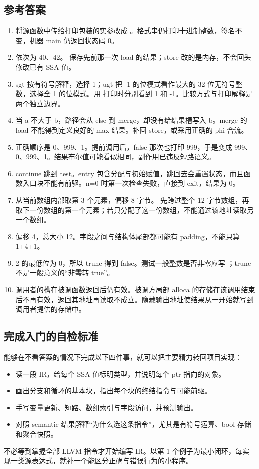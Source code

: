 \subsection{参考答案}
\begin{enumerate}[label=\textbf{\arabic*.}]
 \item 将源函数中传给打印包装的实参改成 。格式串仍打印十进制整数，签名不变，机器 main 仍返回状态码 0。
 \item 依次为 40、42。 保存先前那一次 load 的结果；store 改的是内存，不会回头修改已有 SSA 值。
 \item sgt 按有符号解释，选择 1；ugt 把 -1 的位模式看作最大的 32 位无符号整数，选择全 1 的位模式。用  打印时分别看到 1 和 -1。比较方式与打印解释是两个独立边界。
 \item 当 a 不大于 b，路径会从 else 到 merge，却没有给结果槽写入 b。merge 的 load 不能得到定义良好的 max 结果。补回 store，或采用正确的 phi 合流。
 \item 正确顺序是 0、999、1。提前调用后，false 那次也打印 999，于是变成 999、0、999、1。结果布尔值可能看似相同，副作用已违反短路语义。
 \item continue 跳到 test。entry 包含分配与初始赋值，跳回去会重置状态，而且函数入口块不能有前驱。n=0 时第一次检查失败，直接到 exit，结果为 0。
 \item {} 从当前数组内部取第 3 个元素，偏移 8 字节。 先跨过整个 12 字节数组，再取下一份数组的第一个元素；若只分配了这一份数组，不能通过该地址读取另一个数组。
 \item 偏移 4，总大小 12。字段之间与结构体尾部都可能有 padding，不能只算 1+4+1。
 \item 2 的最低位为 0，所以 trunc 得到 false。测试一般整数是否非零应写 ；trunc 不是一般意义的“非零转 true”。
 \item 调用者的槽在被调函数返回后仍有效。被调方局部 alloca 的存储在该调用结束后不再有效，返回其地址再读取不成立。隐藏输出地址使结果从一开始就写到调用者提供的存储中。
\end{enumerate}

\subsection{完成入门的自检标准}
能够在不看答案的情况下完成以下四件事，就可以把主要精力转回项目实现：
\begin{itemize}
 \item 读一段 IR，给每个 SSA 值标明类型，并说明每个 ptr 指向的对象。
 \item 画出分支和循环的基本块，指出每个块的终结指令与可能前驱。
 \item 手写变量更新、短路、数组索引与字段访问，并预测输出。
 \item 对照 semantic 结果解释“为什么选这条指令”，尤其是有符号运算、bool 存储和聚合快照。
\end{itemize}
不必等到掌握全部 LLVM 指令才开始编写 IR。以第 1 个例子为最小闭环，每实现一类源表达式，就补一个能区分正确与错误行为的小程序。
